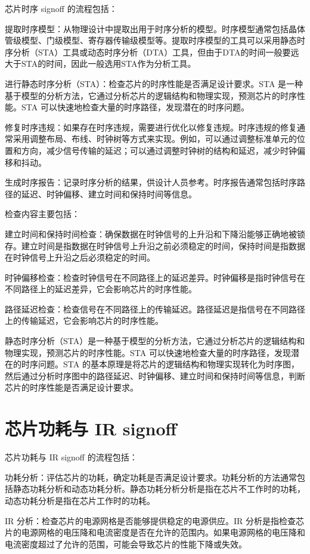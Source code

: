 芯片时序 signoff 的流程包括：

提取时序模型：从物理设计中提取出用于时序分析的模型。时序模型通常包括晶体管级模型、门级模型、寄存器传输级模型等。提取时序模型的工具可以采用静态时序分析（STA）工具或动态时序分析（DTA）工具，但由于DTA的时间一般要远大于STA的时间，因此一般选用STA作为分析工具。

进行静态时序分析（STA）：检查芯片的时序性能是否满足设计要求。STA 是一种基于模型的分析方法，它通过分析芯片的逻辑结构和物理实现，预测芯片的时序性能。STA 可以快速地检查大量的时序路径，发现潜在的时序问题。

修复时序违规：如果存在时序违规，需要进行优化以修复违规。时序违规的修复通常采用调整布局、布线、时钟树等方式来实现。例如，可以通过调整标准单元的位置和方向，减少信号传输的延迟；可以通过调整时钟树的结构和延迟，减少时钟偏移和抖动。

生成时序报告：记录时序分析的结果，供设计人员参考。时序报告通常包括时序路径的延迟、时钟偏移、建立时间和保持时间等信息。

检查内容主要包括：

建立时间和保持时间检查：确保数据在时钟信号的上升沿和下降沿能够正确地被锁存。建立时间是指数据在时钟信号上升沿之前必须稳定的时间，保持时间是指数据在时钟信号上升沿之后必须稳定的时间。

时钟偏移检查：检查时钟信号在不同路径上的延迟差异。时钟偏移是指时钟信号在不同路径上的延迟差异，它会影响芯片的时序性能。

路径延迟检查：检查信号在不同路径上的传输延迟。路径延迟是指信号在不同路径上的传输延迟，它会影响芯片的时序性能。

静态时序分析（STA）是一种基于模型的分析方法，它通过分析芯片的逻辑结构和物理实现，预测芯片的时序性能。STA 可以快速地检查大量的时序路径，发现潜在的时序问题。STA 的基本原理是将芯片的逻辑结构和物理实现转化为时序图，然后通过分析时序图中的路径延迟、时钟偏移、建立时间和保持时间等信息，判断芯片的时序性能是否满足设计要求。

\section{芯片功耗与 IR signoff}\label{sec:17-chip-backend-011}

芯片功耗与 IR signoff 的流程包括：

功耗分析：评估芯片的功耗，确定功耗是否满足设计要求。功耗分析的方法通常包括静态功耗分析和动态功耗分析。静态功耗分析分析是指在芯片不工作时的功耗，动态功耗分析是指在芯片工作时的功耗。

IR 分析：检查芯片的电源网格是否能够提供稳定的电源供应。IR 分析是指检查芯片的电源网格的电压降和电流密度是否在允许的范围内。如果电源网格的电压降和电流密度超过了允许的范围，可能会导致芯片的性能下降或失效。


